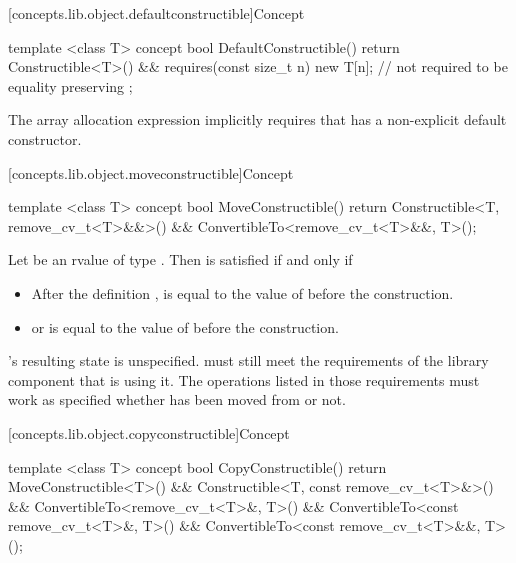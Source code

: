 [concepts.lib.object.defaultconstructible]{Concept }

%
\begin{itemdecl}
template <class T>
concept bool DefaultConstructible() {
  return Constructible<T>() &&
    requires(const size_t n) {
      new T[n]{}; // not required to be equality preserving
    };
}
\end{itemdecl}

\pnum
\enternote The array allocation expression  implicitly
requires that  has a non-explicit default constructor. \exitnote

[concepts.lib.object.moveconstructible]{Concept }

%
\begin{itemdecl}
template <class T>
concept bool MoveConstructible() {
  return Constructible<T, remove_cv_t<T>&&>() &&
    ConvertibleTo<remove_cv_t<T>&&, T>();
}
\end{itemdecl}

\begin{itemdescr}
\pnum
Let  be an rvalue of type .
Then  is satisfied if and only if

\begin{itemize}
\item After the definition ,  is equal to the value of
 before the construction.
\item {} or  is equal
to the value of  before the construction.
\end{itemize}

\pnum
{}'s resulting state is unspecified. \enternote {} must still meet the
requirements of the library component that is using it. The operations listed
in those requirements must work as specified whether  has been moved
from or not.\exitnote

\end{itemdescr}

[concepts.lib.object.copyconstructible]{Concept }

%
\begin{itemdecl}
template <class T>
concept bool CopyConstructible() {
  return MoveConstructible<T>() &&
    Constructible<T, const remove_cv_t<T>&>() &&
    ConvertibleTo<remove_cv_t<T>&, T>() &&
    ConvertibleTo<const remove_cv_t<T>&, T>() &&
    ConvertibleTo<const remove_cv_t<T>&&, T>();
}
\end{itemdecl}

